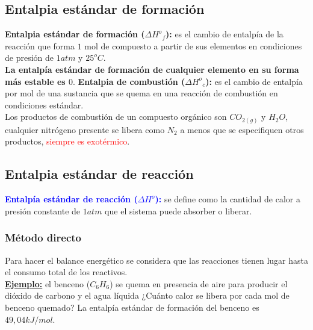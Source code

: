     \subsection{Entalpia estándar de formación}
    \sangria{} \textbf{Entalpia estándar de formación ($\Delta {H^o}_{f}$):} es el cambio de entalpía de la reacción que forma $1$ mol de compuesto a partir de sus elementos en condiciones de presión de $1atm$ y $25^o C$. \\
    \sangria{} \textbf{La entalpía estándar de formación de cualquier elemento en su forma más estable es $0$}.
    \sangria{} \textbf{Entalpia de combustión ($\Delta {H^o}_{c}$):} es el cambio de entalpía por mol de una sustancia que se quema en una reacción de combustión en condiciones estándar. \\
    Los productos de combustión de un compuesto orgánico son $CO_{2(g)}$ y $H_2O$, cualquier nitrógeno presente se libera como $N_2$ a menos que se especifiquen otros productos, \textcolor{red}{siempre es exotérmico}.
    \saltoPag{}
    \subsection{Entalpia estándar de reacción}
        \textcolor{blue}{\textbf{Entalpía estándar de reacción ($\Delta {H^o}$):}} se define como la cantidad de calor a presión constante de $1atm$ que el sistema puede absorber o liberar.
        \subsubsection{Método directo}
            \sangria{} Para hacer el balance energético se considera que las reacciones tienen lugar hasta el consumo total de los reactivos. \\
            \textbf{\underline{Ejemplo:}} el benceno ($C_6H_6$) se quema en presencia de aire para producir el dióxido de carbono y el agua líquida ¿Cuánto calor se libera por cada mol de benceno quemado? La entalpía estándar de formación del benceno es $49,04 kJ / mol$.

